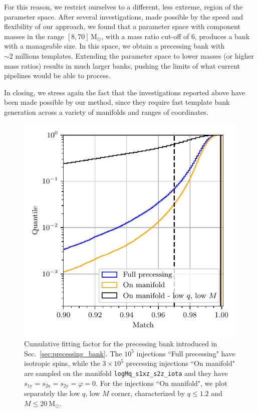 \documentclass[twocolumn,showpacs,preprintnumbers,nofootinbib,prd,
superscriptaddress,10pt]{revtex4-2}
\begin{document}
For this reason, we restrict ourselves to a different, less extreme, region of the parameter space. After several investigations, made possible by the speed and flexibility of our approach, we found that a parameter space with component masses in the range $[8, 70]\,\mathrm{M_\odot}$, with a mass ratio cut-off of $6$, produces a bank with a manageable size.
In this space, we obtain a precessing bank with $\sim 2 \text{ millions}$ templates. Extending the parameter space to lower masses (or higher mass ratios) results in much larger banks, pushing the limits of what current pipelines would be able to process.

In closing, we stress again the fact that the investigations reported above have been made possible by our method, since they require fast template bank generation across a variety of manifolds and ranges of coordinates.


\begin{figure}[t]
	\centering
	\includegraphics[scale = 1.]{precessing_hist}
	\caption{Cumulative fitting factor for the precessing bank introduced in Sec.~\ref{sec:precessing_bank}. The $10^5$ injections ``Full precessing" have isotropic spins, while the $3\times 10^5$ precessing injections ``On manifold" are sampled on the manifold \texttt{logMq\_s1xz\_s2z\_iota} and they have $s_\text{1y} = s_\text{2x} = s_\text{2y} = \varphi = 0$. For the injections ``On manifold", we plot separately the low $q$, low $M$ corner, characterized by $q \leq 1.2$ and $M \leq \SI{20}{\mathrm{M_\odot}}$. }
	\label{fig:precessing_hist}
\end{figure}
\end{document}
